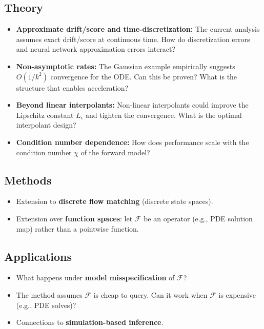 \documentclass[12pt,fleqn]{article}
\numberwithin{equation}{section}
\begin{document}
\subsection{Theory}
\begin{itemize}
	\item \textbf{Approximate drift/score and time-discretization:} The current analysis assumes exact drift/score at continuous time. How do discretization errors and neural network approximation errors interact?
	\item \textbf{Non-asymptotic rates:} The Gaussian example empirically suggests $O(1/k^2)$ convergence for the ODE. Can this be proven? What is the structure that enables acceleration?
	\item \textbf{Beyond linear interpolants:} Non-linear interpolants could improve the Lipschitz constant $L_\epsilon$ and tighten the convergence. What is the optimal interpolant design?
	\item \textbf{Condition number dependence:} How does performance scale with the condition number $\chi$ of the forward model?
\end{itemize}

\subsection{Methods}
\begin{itemize}
	\item Extension to \textbf{discrete flow matching} (discrete state spaces).
	\item Extension over \textbf{function spaces}: let $\mathcal F$ be an operator (e.g., PDE solution map) rather than a pointwise function.
\end{itemize}

\subsection{Applications}
\begin{itemize}
	\item What happens under \textbf{model misspecification} of $\mathcal F$?
	\item The method assumes $\mathcal F$ is cheap to query. Can it work when $\mathcal F$ is expensive (e.g., PDE solves)?
	\item Connections to \textbf{simulation-based inference}.
\end{itemize}
\end{document}
